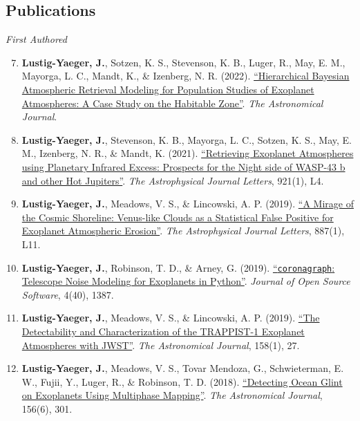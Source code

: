 \documentclass[margin,10pt]{res}
\newenvironment{benumerate}[1]{
    \let\oldItem\item
    \def\item{\addtocounter{enumi}{-2}\oldItem}
    \begin{enumerate}
    \setcounter{enumi}{#1}
    \addtocounter{enumi}{1}
}{
    \end{enumerate}
}
\begin{document}
\begin{resume}
\section{Publications} 
                {\sl First Authored}
                \begin{benumerate}{6}
                    \item \textbf{Lustig-Yaeger, J.}, Sotzen, K. S., Stevenson, K. B., Luger, R., May, E. M., Mayorga, L. C., Mandt, K., \& Izenberg, N. R. (2022). \href{https://ui.adsabs.harvard.edu/abs/2022arXiv220200701L/abstract}{``Hierarchical Bayesian Atmospheric Retrieval Modeling for Population Studies of Exoplanet Atmospheres: A Case Study on the Habitable Zone''}. \textit{The Astronomical Journal}.
                    \item \textbf{Lustig-Yaeger, J.}, Stevenson, K. B., Mayorga, L. C., Sotzen, K. S., May, E. M., Izenberg, N. R., \& Mandt, K. (2021). \href{https://doi.org/10.3847/2041-8213/ac2cc2}{``Retrieving Exoplanet Atmospheres using Planetary Infrared Excess: Prospects for the Night side of WASP-43 b and other Hot Jupiters''}. \textit{The Astrophysical Journal Letters}, 921(1), L4.
                    \item \textbf{Lustig-Yaeger, J.}, Meadows, V. S., \& Lincowski, A. P. (2019). \href{https://doi.org/10.3847/2041-8213/ab5965}{``A Mirage of the Cosmic Shoreline: Venus-like Clouds as a Statistical False Positive for Exoplanet Atmospheric Erosion''}. \textit{The Astrophysical Journal Letters}, 887(1), L11. 
                    \item \textbf{Lustig-Yaeger, J.}, Robinson, T. D., \& Arney, G. (2019). \href{https://doi.org/10.21105/joss.01387}{``\texttt{coronagraph}: Telescope Noise Modeling for Exoplanets in Python''}. \textit{Journal of Open Source Software}, 4(40), 1387.
                    \item \textbf{Lustig-Yaeger, J.}, Meadows, V. S., \& Lincowski, A. P. (2019). \href{https://doi.org/10.3847/1538-3881/ab21e0}{``The Detectability and Characterization of the TRAPPIST-1 Exoplanet Atmospheres with JWST''}. \textit{The Astronomical Journal}, 158(1), 27.
                    \item \textbf{Lustig-Yaeger, J.}, Meadows, V. S., Tovar Mendoza, G., Schwieterman, E. W., Fujii, Y., Luger, R., \&  Robinson, T. D. (2018). \href{https://doi.org/10.3847/1538-3881/aaed3a}{``Detecting Ocean Glint on Exoplanets Using Multiphase Mapping''}. \textit{The Astronomical Journal}, 156(6), 301.
                \end{benumerate}

\end{resume}
\end{document}
